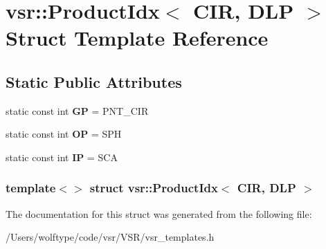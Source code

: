 \hypertarget{structvsr_1_1_product_idx_3_01_c_i_r_00_01_d_l_p_01_4}{\section{vsr\-:\-:Product\-Idx$<$ C\-I\-R, D\-L\-P $>$ Struct Template Reference}
\label{structvsr_1_1_product_idx_3_01_c_i_r_00_01_d_l_p_01_4}
}
\subsection*{Static Public Attributes}
\begin{DoxyCompactItemize}
\item 
\hypertarget{structvsr_1_1_product_idx_3_01_c_i_r_00_01_d_l_p_01_4_a8b812011b6766391be1b2f97fb0595c0}{static const int {\bfseries G\-P} = P\-N\-T\-\_\-\-C\-I\-R}\label{structvsr_1_1_product_idx_3_01_c_i_r_00_01_d_l_p_01_4_a8b812011b6766391be1b2f97fb0595c0}

\item 
\hypertarget{structvsr_1_1_product_idx_3_01_c_i_r_00_01_d_l_p_01_4_ab1001f90949c03915267b8ebf80f4999}{static const int {\bfseries O\-P} = S\-P\-H}\label{structvsr_1_1_product_idx_3_01_c_i_r_00_01_d_l_p_01_4_ab1001f90949c03915267b8ebf80f4999}

\item 
\hypertarget{structvsr_1_1_product_idx_3_01_c_i_r_00_01_d_l_p_01_4_a522f5a177522a674ece9fbf4d8957b47}{static const int {\bfseries I\-P} = S\-C\-A}\label{structvsr_1_1_product_idx_3_01_c_i_r_00_01_d_l_p_01_4_a522f5a177522a674ece9fbf4d8957b47}

\end{DoxyCompactItemize}
\subsubsection*{template$<$$>$ struct vsr\-::\-Product\-Idx$<$ C\-I\-R, D\-L\-P $>$}



The documentation for this struct was generated from the following file\-:\begin{DoxyCompactItemize}
\item 
/\-Users/wolftype/code/vsr/\-V\-S\-R/vsr\-\_\-templates.\-h\end{DoxyCompactItemize}
